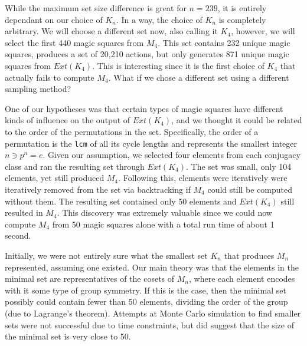 \documentclass[12pt]{report}
\begin{document}
\par While the maximum set size difference is great for $n=239$, it is entirely dependant on our
choice of $K_n$. In a way, the choice of $K_n$ is completely arbitrary. We will choose a different
set now, also calling it $K_4$, however, we will select the first 440 magic squares from $M_4$.
This set contains 232 unique magic squares, produces a set of 20,210 actions, but only generates
871 unique magic squares from $Ext\left(K_4\right)$. This is interesting since it is the first
choice of $K_4$ that actually fails to compute $M_4$. What if we chose a different set using a
different sampling method?

\par One of our hypotheses was that certain types of magic squares have different kinds of
influence on the output of $Ext\left(K_4\right)$, and we thought it could be related to the order
of the permutations in the set. Specifically, the order of a permutation is the \texttt{lcm} of all
its cycle lengths and represents the smallest integer $n \ni p^n = e$. Given our assumption, we
selected four elements from each conjugacy class and ran the resulting set through
$Ext\left(K_4\right)$. The set was small, only 104 elements, yet still produced $M_4$. Following
this, elements were iteratively were iteratively removed from the set via backtracking if $M_4$
could still be computed without them. The resulting set contained only 50 elements and
$Ext\left(K_4\right)$ still resulted in $M_4$. This discovery was extremely valuable since we could
now compute $M_4$ from 50 magic squares alone with a total run time of about 1 second.

\par Initially, we were not entirely sure what the smallest set $K_n$ that produces $M_n$
represented, assuming one existed. Our main theory was that the elements in the minimal set are
representatives of the cosets of $M_n$, where each element encodes with it some type of group
symmetry. If this is the case, then the minimal set possibly could contain fewer than 50 elements,
dividing the order of the group (due to Lagrange's theorem). Attempts at Monte Carlo simulation to
find smaller sets were not successful due to time constraints, but did suggest that the size of the
minimal set is very close to 50.
\end{document}
